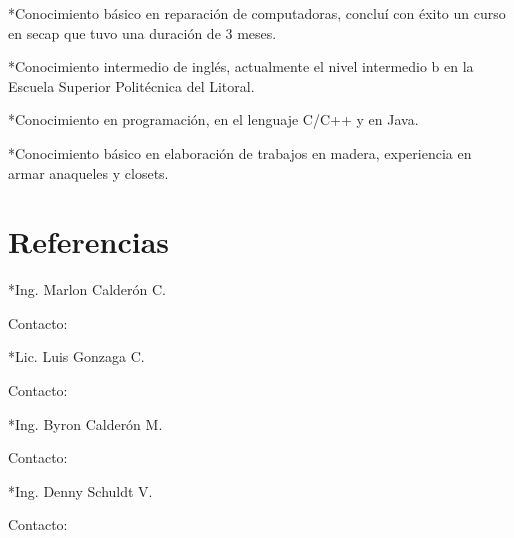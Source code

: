 \documentclass{res}
\begin{document}
\begin{resume}
       *Conocimiento b\'asico en reparaci\'on de computadoras, conclu\'i con \'exito un curso en secap que tuvo una duraci\'on de 3 meses. 

       *Conocimiento intermedio de ingl\'es, actualmente el nivel intermedio b en la Escuela Superior Polit\'ecnica del Litoral.

       *Conocimiento en programaci\'on, en el lenguaje C/C++ y en Java. 

       *Conocimiento b\'asico en elaboraci\'on de trabajos en madera, experiencia en armar anaqueles y closets.

\vspace{-0.15in}
\section{\large Referencias}
\vspace{0.1in}
       *Ing. Marlon Calder\'on C.
\vspace{-0.2in} 

\hspace{1in}Contacto:  

       *Lic. Luis Gonzaga C. 
\vspace{-0.2in} 

\hspace{1in}Contacto:  
       
       *Ing. Byron Calder\'on M. 
\vspace{-0.2in} 

\hspace{1in}Contacto:  

       *Ing. Denny Schuldt V. 
\vspace{-0.2in} 

\hspace{1in}Contacto:  

\vspace{-0.15in}
\end{resume}
\end{document}
